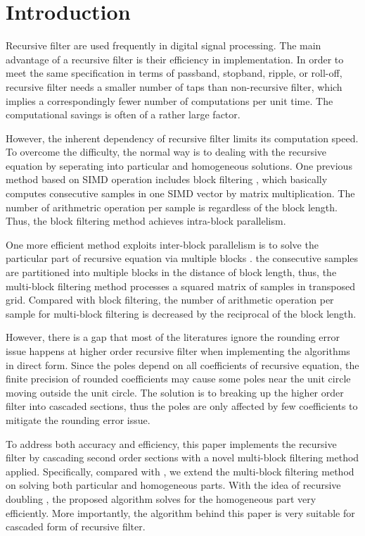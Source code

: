 \section{Introduction}
\label{sec:introduction}

Recursive filter are used frequently in digital signal processing.
The main advantage of a recursive filter is their efficiency in implementation.
In order to meet the same specification in terms of passband, stopband, ripple, or roll-off,
recursive filter needs a smaller number of taps than non-recursive filter, which implies
a correspondingly fewer number of computations per unit time. 
The computational savings is often of a rather large factor.

However,
the inherent dependency of recursive filter limits its computation speed.
To overcome the difficulty, the normal way is to dealing with the recursive equation by seperating into
particular and homogeneous solutions.
One previous method based on SIMD operation includes block filtering \cite{Sung_86}, 
which basically computes consecutive samples in one SIMD vector by matrix multiplication. 
The number of arithmetric operation per sample is regardless of the block length. Thus, the block filtering method achieves
intra-block parallelism. 

One more efficient method exploits inter-block parallelism is to solve the particular part of recursive equation via multiple blocks \cite{Jaewoo_09}.
the consecutive samples are partitioned into multiple blocks in the distance of block length, thus, the multi-block filtering method
processes a squared matrix of samples in transposed grid. Compared with block filtering, the number of arithmetic operation per sample for multi-block filtering is decreased 
by the reciprocal of the block length.

However, there is a gap that most of the literatures ignore the rounding error issue happens at higher order recursive filter when implementing the algorithms in direct form.
Since the poles depend on all coefficients of recursive equation, the finite precision of rounded coefficients may cause some poles near the unit circle
moving outside the unit circle. The solution is to breaking up the higher order filter into cascaded sections, thus the poles are only affected by few coefficients to mitigate
the rounding error issue.

To address both accuracy and efficiency, this paper implements the recursive filter by cascading second order sections with a novel multi-block filtering method applied.
Specifically, compared with \cite{Jaewoo_09}, we extend the multi-block filtering method on solving both particular and homogeneous parts. With the idea of recursive doubling \cite{Kogge_73},
the proposed algorithm solves for the homogeneous part very efficiently. More importantly, the algorithm behind this paper is very suitable for cascaded form of recursive filter.


